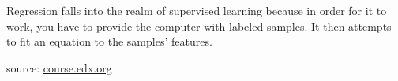 \documentclass{article}
\begin{document}
\par Regression falls into the realm of supervised learning because in order for it to work, you have to provide the computer with labeled samples. It then attempts to fit an equation to the samples' features.

\begin{flushright}
    source: \href{https://courses.edx.org/courses/course-v1:Microsoft+DAT210x+6T2016/courseware/e36e6b45ae5d4032bef2ec557c1ff48f/a8cf8333f6044e9b9a357b7797f282e3/?child=first}{course.edx.org}  
\end{flushright}
\end{document}
